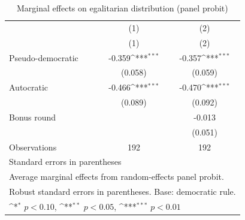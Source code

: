 \begin{table}[htbp]\centering
\def\sym#1{\ifmmode^{#1}\else\(^{#1}\)\fi}
\caption{Marginal effects on egalitarian distribution (panel probit)}
\begin{tabular}{l*{2}{c}}
\toprule
            &\multicolumn{1}{c}{(1)}&\multicolumn{1}{c}{(2)}\\
            &\multicolumn{1}{c}{(1)}&\multicolumn{1}{c}{(2)}\\
\midrule
Pseudo-democratic&      -0.359\sym{***}&      -0.357\sym{***}\\
            &     (0.058)         &     (0.059)         \\
Autocratic  &      -0.466\sym{***}&      -0.470\sym{***}\\
            &     (0.089)         &     (0.092)         \\
Bonus round &                     &      -0.013         \\
            &                     &     (0.051)         \\
\midrule
Observations&         192         &         192         \\
\bottomrule
\multicolumn{3}{l}{\footnotesize Standard errors in parentheses}\\
\multicolumn{3}{l}{\footnotesize Average marginal effects from random-effects panel probit.}\\
\multicolumn{3}{l}{\footnotesize Robust standard errors in parentheses. Base: democratic rule.}\\
\multicolumn{3}{l}{\footnotesize \sym{*} \(p<0.10\), \sym{**} \(p<0.05\), \sym{***} \(p<0.01\)}\\
\end{tabular}
\end{table}
